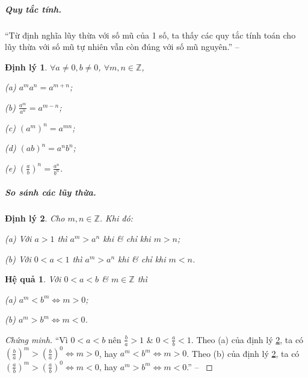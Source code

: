 \documentclass{article}
\numberwithin{equation}{section}
\newtheorem{hequa}{Hệ quả}[section]
\newtheorem{dinhly}{Định lý}[section]
\begin{document}
\subparagraph{Quy tắc tính.} ``Từ định nghĩa lũy thừa với số mũ của 1 số, ta thấy các quy tắc tính toán cho lũy thừa với số mũ tự nhiên vẫn còn đúng với số mũ nguyên.'' -- \cite[p. 70]{SGK_Toan_12_giai_tich_nang_cao}

\begin{dinhly}
	$\forall a\ne 0,b\ne 0$, $\forall m,n\in\mathbb{Z}$,
	\begin{enumerate*}
		\item[(a)] $a^ma^n = a^{m+n}$;
		\item[(b)] $\frac{a^m}{a^n} = a^{m-n}$;
		\item[(c)] $(a^m)^n = a^{mn}$;
		\item[(d)] $(ab)^n = a^nb^n$;
		\item[(e)] $\left(\frac{a}{b}\right)^n = \frac{a^n}{b^n}$.
	\end{enumerate*}
\end{dinhly}

\subparagraph{So sánh các lũy thừa.}
\begin{dinhly}
	\label{thm:so sanh cac luy thua}
	Cho $m,n\in\mathbb{Z}$. Khi đó:
	\begin{enumerate*}
		\item[(a)] Với $a > 1$ thì $a^m > a^n$ khi \& chỉ khi $m > n$;
		\item[(b)] Với $0 < a < 1$ thì $a^m > a^n$ khi \& chỉ khi $m < n$.
	\end{enumerate*}
\end{dinhly}

\begin{hequa}
	Với $0 < a < b$ \& $m\in\mathbb{Z}$ thì
	\begin{enumerate*}
		\item[(a)] $a^m < b^m\Leftrightarrow m > 0$;
		\item[(b)] $a^m > b^m\Leftrightarrow m < 0$.
	\end{enumerate*}
\end{hequa}

\begin{proof}[Chứng minh]
	``Vì $0 < a < b$ nên $\frac{b}{a} > 1$ \& $0 < \frac{a}{b} < 1$. Theo (a) của định lý \ref{thm:so sanh cac luy thua}, ta có $\left(\frac{b}{a}\right)^m > \left(\frac{b}{a}\right)^0\Leftrightarrow m > 0$, hay $a^m < b^m\Leftrightarrow m > 0$. Theo (b) của định lý \ref{thm:so sanh cac luy thua}, ta có $\left(\frac{a}{b}\right)^m > \left(\frac{a}{b}\right)^0\Leftrightarrow m < 0$, hay $a^m > b^m\Leftrightarrow m < 0$.'' -- \cite[p. 71]{SGK_Toan_12_giai_tich_nang_cao}
\end{proof}
\end{document}
